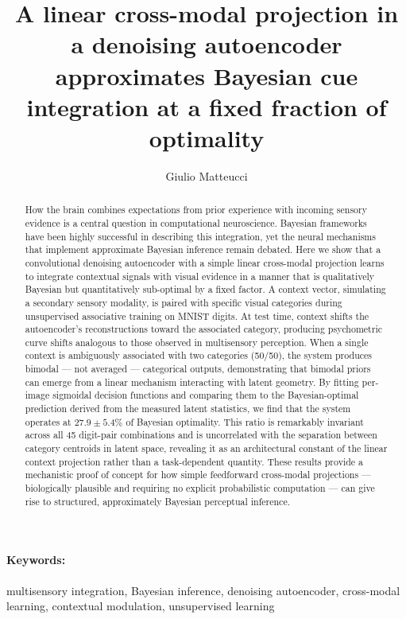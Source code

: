 \documentclass[11pt,a4paper]{article}
\title{A linear cross-modal projection in a denoising autoencoder approximates Bayesian cue integration at a fixed fraction of optimality}
\author[1]{Giulio Matteucci}
\affil[1]{Department of Otorhinolaryngology, Head and Neck Surgery, CHUV, University of Lausanne, Switzerland}
\date{}
\begin{document}
\maketitle

\begin{abstract}
How the brain combines expectations from prior experience with incoming sensory evidence is a central question in computational neuroscience.
Bayesian frameworks have been highly successful in describing this integration, yet the neural mechanisms that implement approximate Bayesian inference remain debated.
Here we show that a convolutional denoising autoencoder with a simple linear cross-modal projection learns to integrate contextual signals with visual evidence in a manner that is qualitatively Bayesian but quantitatively sub-optimal by a fixed factor.
A context vector, simulating a secondary sensory modality, is paired with specific visual categories during unsupervised associative training on MNIST digits.
At test time, context shifts the autoencoder's reconstructions toward the associated category, producing psychometric curve shifts analogous to those observed in multisensory perception.
When a single context is ambiguously associated with two categories (50/50), the system produces bimodal --- not averaged --- categorical outputs, demonstrating that bimodal priors can emerge from a linear mechanism interacting with latent geometry.
By fitting per-image sigmoidal decision functions and comparing them to the Bayesian-optimal prediction derived from the measured latent statistics, we find that the system operates at $27.9 \pm 5.4\%$ of Bayesian optimality.
This ratio is remarkably invariant across all 45 digit-pair combinations and is uncorrelated with the separation between category centroids in latent space, revealing it as an architectural constant of the linear context projection rather than a task-dependent quantity.
These results provide a mechanistic proof of concept for how simple feedforward cross-modal projections --- biologically plausible and requiring no explicit probabilistic computation --- can give rise to structured, approximately Bayesian perceptual inference.
\end{abstract}

\paragraph{Keywords:} multisensory integration, Bayesian inference, denoising autoencoder, cross-modal learning, contextual modulation, unsupervised learning
\end{document}
